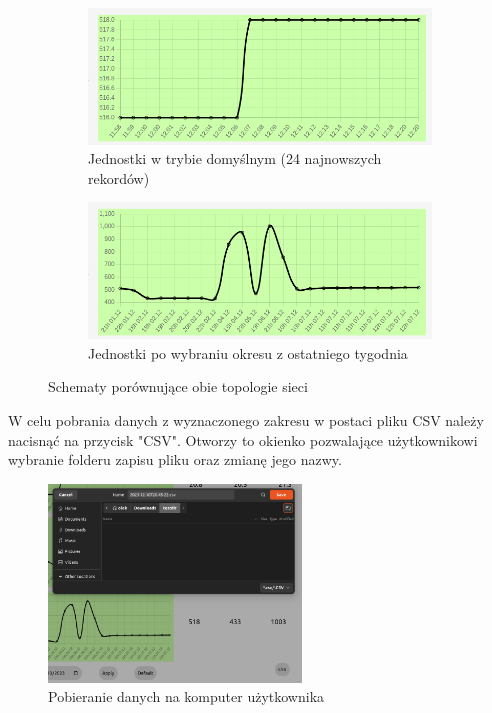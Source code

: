 \begin{figure}[H]
    \centering
    \begin{subfigure}{0.7\textwidth}
        \centering
        \includegraphics[width=\linewidth]{zdj/app/time-unit1.png}
        \caption{Jednostki w trybie domyślnym (24 najnowszych rekordów)}
    \end{subfigure}
    \begin{subfigure}{0.7\textwidth}
        \centering
        \includegraphics[width=\linewidth]{zdj/app/time-unit2.png}
        \caption{Jednostki po wybraniu okresu z ostatniego tygodnia}
    \end{subfigure}
       
    \caption{Schematy porównujące obie topologie sieci}
\end{figure}
W celu pobrania danych z wyznaczonego zakresu w postaci pliku CSV należy nacisnąć na przycisk "CSV". Otworzy to okienko pozwalające użytkownikowi wybranie folderu
zapisu pliku oraz zmianę jego nazwy. 

\begin{figure}[H]
    \centering
    \includegraphics[width=0.6\textwidth]{zdj/app/download-csv.png}
    \caption{Pobieranie danych na komputer użytkownika}
\end{figure}

